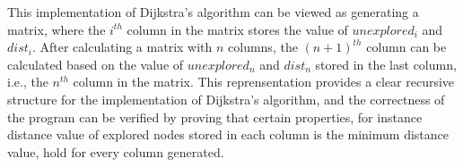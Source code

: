 This implementation of Dijkstra's algorithm can be viewed as generating a matrix, where the $i^{th}$ column in the matrix stores the value of $unexplored_i$ and $dist_i$. After calculating a matrix with $n$ columns, the $(n+1)^{th}$ column can be calculated based on the value of $unexplored_n$ and $dist_n$ stored in the last column, i.e., the $n^{th}$ column in the matrix. This reprensentation provides a clear recursive structure for the implementation of Dijkstra's algorithm, and the correctness of the program can be verified by proving that certain properties, for instance distance value of explored nodes stored in each column is the minimum distance value, hold for every column generated. 
